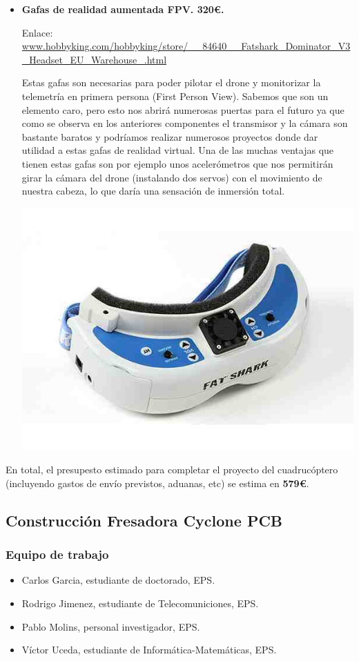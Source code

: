 \documentclass[12pt,twoside]{report}
\begin{document}
\begin{itemize}
\item {\bf Gafas de realidad aumentada FPV. 320\euro{}.}

Enlace: \url{www.hobbyking.com/hobbyking/store/__84640__Fatshark_Dominator_V3_Headset_EU_Warehouse_.html}

Estas gafas son necesarias para poder pilotar el drone y monitorizar la telemetría en primera persona (First Person View). Sabemos que son un elemento caro, pero esto nos abrirá numerosas puertas para el futuro ya que como se observa en los anteriores componentes el transmisor y la cámara son bastante baratos y podríamos realizar numerosos proyectos donde dar utilidad a estas gafas de realidad virtual. Una de las muchas ventajas que tienen estas  gafas son por ejemplo unos acelerómetros que nos permitirán girar la cámara del drone (instalando dos servos) con el movimiento de nuestra cabeza, lo que daría una sensación de inmersión total.

\centerline{
    \includegraphics[width=0.45\linewidth]{fotos/gafas.jpg}}

\end{itemize}

En total, el presupesto estimado para completar el proyecto del cuadrucóptero (incluyendo gastos de envío previstos, aduanas, etc) se estima en \textbf{579\euro{}}.








\subsection{Construcción Fresadora Cyclone PCB}
\subsubsection{Equipo de trabajo}
\begin{itemize}
\item Carlos Garcia, estudiante de doctorado, EPS.
\item Rodrigo Jimenez, estudiante de Telecomuniciones, EPS.
\item Pablo Molins, personal investigador, EPS.
\item Víctor Uceda, estudiante de Informática-Matemáticas, EPS.
\end{itemize}
\end{document}
